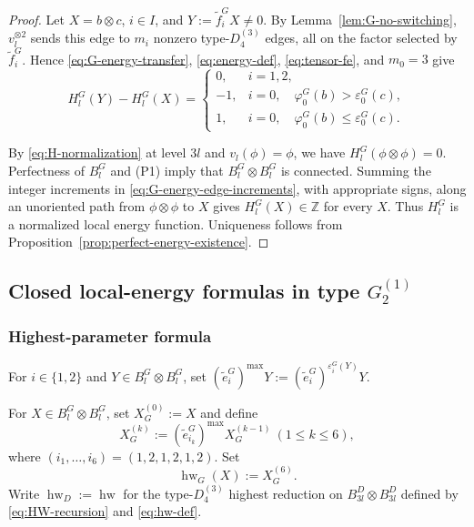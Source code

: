 \documentclass[11pt,reqno]{amsart}
\newcommand{\hw}{\operatorname{hw}}
\numberwithin{table}{section}
\numberwithin{equation}{section}
\theoremstyle{plain}
\theoremstyle{definition}
\begin{document}
\begin{proof}
	Let \(X=b\otimes c\), \(i\in I\), and
	\(Y:=\widetilde f_i^G X\ne0\).
	By Lemma~\ref{lem:G-no-switching}, \(v_l^{\otimes2}\)
	sends this edge to \(m_i\) nonzero type-\(D_4^{(3)}\) edges,
	all on the factor selected by \(\widetilde f_i^G\).
	Hence \eqref{eq:G-energy-transfer}, \eqref{eq:energy-def},
	\eqref{eq:tensor-fe}, and \(m_0=3\) give
	\begin{equation}\label{eq:G-energy-edge-increments}
		H_l^G(Y)-H_l^G(X)
		=
		\begin{cases}
			0,
			&i=1,2,\\
			-1,
			&i=0,\quad
			\varphi_0^G(b)>\varepsilon_0^G(c),\\
			1,
			&i=0,\quad
			\varphi_0^G(b)\le\varepsilon_0^G(c).
		\end{cases}
	\end{equation}
	
	By \eqref{eq:H-normalization} at level \(3l\) and
	\(v_l(\phi)=\phi\), we have \(H_l^G(\phi\otimes\phi)=0\).
	Perfectness of \(B_l^G\) and \textup{(P1)} imply that
	\(B_l^G\otimes B_l^G\) is connected.
	Summing the integer increments in
	\eqref{eq:G-energy-edge-increments}, with appropriate signs,
	along an unoriented path from \(\phi\otimes\phi\) to \(X\)
	gives \(H_l^G(X)\in\mathbb Z\) for every \(X\).
	Thus \(H_l^G\) is a normalized local energy function.
	Uniqueness follows from
	Proposition~\ref{prop:perfect-energy-existence}.
\end{proof}

\subsection{\texorpdfstring{Closed local-energy formulas in type $G_2^{(1)}$}
		{Closed local-energy formulas in type G2(1)}}

\subsubsection{Highest-parameter formula}

For \(i\in\{1,2\}\) and \(Y\in B_l^G\otimes B_l^G\), set
\((\widetilde e_i^G)^{\max}Y
:=(\widetilde e_i^G)^{\varepsilon_i^G(Y)}Y\).

For \(X\in B_l^G\otimes B_l^G\), set \(X_G^{(0)}:=X\) and define
\begin{equation}\label{eq:G-HW-recursion}
	X_G^{(k)}
	:=
	(\widetilde e_{i_k}^G)^{\max}X_G^{(k-1)}
	\ (1\le k\le6),
\end{equation}
where \((i_1,\ldots,i_6)=(1,2,1,2,1,2)\).  Set
\begin{equation}\label{eq:G-hw-def}
	\hw_G(X):=X_G^{(6)}.
\end{equation}
Write \(\hw_D:=\hw\) for the type-\(D_4^{(3)}\) highest reduction on
\(B_{3l}^D\otimes B_{3l}^D\) defined by
\eqref{eq:HW-recursion} and \eqref{eq:hw-def}.
\end{document}
